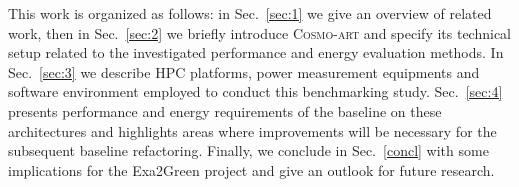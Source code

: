 This  work is  organized as  follows: in  Sec.~\ref{sec:1} we  give an
overview  of  related  work,   then  in  Sec.~\ref{sec:2}  we  briefly
introduce \textsc{Cosmo-art}  and specify its  technical setup related
to  the investigated  performance and  energy evaluation  methods.  In
Sec.~\ref{sec:3}   we  describe   HPC  platforms,   power  measurement
equipments   and  software  environment   employed  to   conduct  this
benchmarking study.  Sec.~\ref{sec:4}  presents performance and energy
requirements  of the  baseline on  these architectures  and highlights
areas where improvements will be necessary for the subsequent baseline
refactoring.   Finally,  we  conclude in Sec.~\ref{concl} with some 
implications for the Exa2Green project and give an outlook for future
research.
